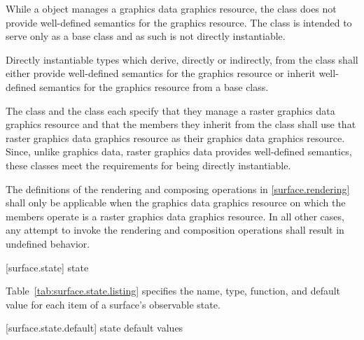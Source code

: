 \pnum
\enternote
While a  object manages a graphics data graphics resource, the  class does not provide well-defined semantics for the graphics resource. The  class is intended to serve only as a base class and as such is not directly instantiable.
\exitnote

\pnum
Directly instantiable types which derive, directly or indirectly, from the  class shall either provide well-defined semantics for the graphics resource or inherit well-defined semantics for the graphics resource from a base class.

\pnum
\enterexample
The  class and the  class each specify that they manage a raster graphics data graphics resource and that the members they inherit from the  class shall use that raster graphics data graphics resource as their graphics data graphics resource. Since, unlike graphics data, raster graphics data provides well-defined semantics, these classes meet the requirements for being directly instantiable.
\exitexample

\pnum
The definitions of the rendering and composing operations in \ref{surface.rendering} shall only be applicable when the graphics data graphics resource on which the  members operate is a raster graphics data graphics resource. In all other cases, any attempt to invoke the rendering and composition operations shall result in undefined behavior.

 [surface.state] { state}

\pnum
Table~\ref{tab:surface.state.listing} specifies the name, type, function, and default value for each item of a surface's observable state.

 [surface.state.default] { state default values}

